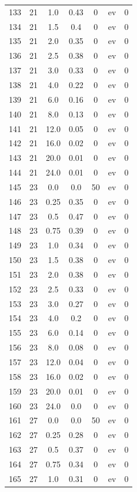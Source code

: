 \documentclass[12pt,a4paper]{article}
\begin{document}
\begin{tabular}{r|cccccc}
	133 & 21 & 1.0 & 0.43 & 0 & ev & 0 \\
	134 & 21 & 1.5 & 0.4 & 0 & ev & 0 \\
	135 & 21 & 2.0 & 0.35 & 0 & ev & 0 \\
	136 & 21 & 2.5 & 0.38 & 0 & ev & 0 \\
	137 & 21 & 3.0 & 0.33 & 0 & ev & 0 \\
	138 & 21 & 4.0 & 0.22 & 0 & ev & 0 \\
	139 & 21 & 6.0 & 0.16 & 0 & ev & 0 \\
	140 & 21 & 8.0 & 0.13 & 0 & ev & 0 \\
	141 & 21 & 12.0 & 0.05 & 0 & ev & 0 \\
	142 & 21 & 16.0 & 0.02 & 0 & ev & 0 \\
	143 & 21 & 20.0 & 0.01 & 0 & ev & 0 \\
	144 & 21 & 24.0 & 0.01 & 0 & ev & 0 \\
	145 & 23 & 0.0 & 0.0 & 50 & ev & 0 \\
	146 & 23 & 0.25 & 0.35 & 0 & ev & 0 \\
	147 & 23 & 0.5 & 0.47 & 0 & ev & 0 \\
	148 & 23 & 0.75 & 0.39 & 0 & ev & 0 \\
	149 & 23 & 1.0 & 0.34 & 0 & ev & 0 \\
	150 & 23 & 1.5 & 0.38 & 0 & ev & 0 \\
	151 & 23 & 2.0 & 0.38 & 0 & ev & 0 \\
	152 & 23 & 2.5 & 0.33 & 0 & ev & 0 \\
	153 & 23 & 3.0 & 0.27 & 0 & ev & 0 \\
	154 & 23 & 4.0 & 0.2 & 0 & ev & 0 \\
	155 & 23 & 6.0 & 0.14 & 0 & ev & 0 \\
	156 & 23 & 8.0 & 0.08 & 0 & ev & 0 \\
	157 & 23 & 12.0 & 0.04 & 0 & ev & 0 \\
	158 & 23 & 16.0 & 0.02 & 0 & ev & 0 \\
	159 & 23 & 20.0 & 0.01 & 0 & ev & 0 \\
	160 & 23 & 24.0 & 0.0 & 0 & ev & 0 \\
	161 & 27 & 0.0 & 0.0 & 50 & ev & 0 \\
	162 & 27 & 0.25 & 0.28 & 0 & ev & 0 \\
	163 & 27 & 0.5 & 0.37 & 0 & ev & 0 \\
	164 & 27 & 0.75 & 0.34 & 0 & ev & 0 \\
	165 & 27 & 1.0 & 0.31 & 0 & ev & 0 \\

\end{tabular}
\end{document}
